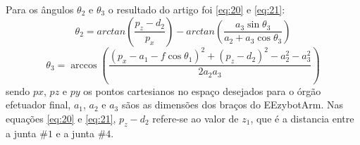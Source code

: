 Para os ângulos $\theta_2$ e $\theta_3$ o resultado do artigo foi \eqref{eq:20} e \eqref{eq:21}:
\begin{equation}
    \theta_2 = arctan \left (\frac{p_z - d_2}{p_x}\right ) - arctan\left (\frac {a_3\sin\theta_3 }{a_2 + a_3\cos\theta_3}\right ) 
    \label{eq:20}
\end{equation}
\begin{equation}
    \theta_3 = \arccos \left ( \frac{(p_x - a_1 - f\cos\theta_1)^2 + (p_z-d_2)^2 - a_2^2-a_3^2}{2a_2a_3} \right )
    \label{eq:21}
\end{equation}
sendo $px$, $pz$ e $py$ os pontos cartesianos no espaço desejados para o órgão efetuador final, $a_1$, $a_2$ e $a_3$ sãos as dimensões dos braços do EEzybotArm. Nas equações \eqref{eq:20} e \eqref{eq:21}, $p_z - d_2$ refere-se ao valor de $z_1$, que é a distancia entre a junta $\#1$ e a junta $\#4$.